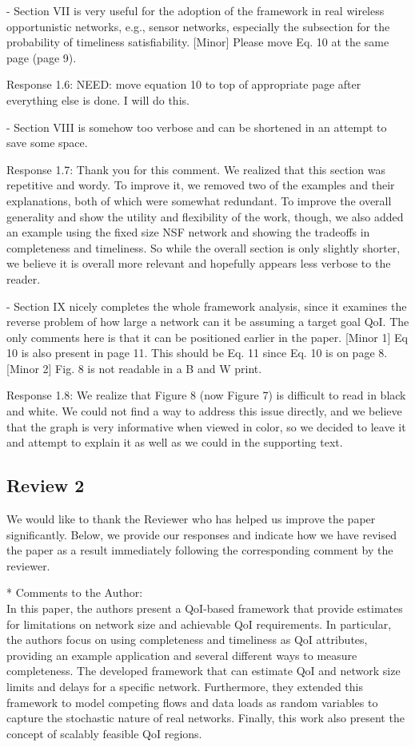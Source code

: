 \documentclass[12pt, letterpaper, onecolumn]{IEEEtran}
\begin{document}
- Section VII is very useful for the adoption of the framework in real wireless opportunistic networks, e.g., sensor networks, especially the subsection for the probability of timeliness satisfiability. [Minor] Please move Eq. 10 at the same page (page 9).

{\color {blue}
Response 1.6: NEED: move equation 10 to top of appropriate page after everything else is done. I will do this.
}

- Section VIII is somehow too verbose and can be shortened in an attempt to save some space.

{\color {blue}
Response 1.7: Thank you for this comment. We realized that this section was repetitive and wordy. To improve it, we removed two of the examples and their explanations, both of which were somewhat redundant. To improve the overall generality and show the utility and flexibility of the work, though, we also added an example using the fixed size NSF network and showing the tradeoffs in completeness and timeliness. So while the overall section is only slightly shorter, we believe it is overall more relevant and hopefully appears less verbose to the reader.
}

- Section IX nicely completes the whole framework analysis, since it examines the reverse problem of how large a network can it be assuming a target goal QoI. The only comments here is that it can be positioned earlier in the paper. [Minor 1] Eq 10 is also present in page 11. This should be Eq. 11 since Eq. 10 is on page 8. [Minor 2] Fig. 8 is not readable in a B and W print. 

{\color {blue}
Response 1.8: We realize that Figure 8 (now Figure 7) is difficult to read in black and white. We could not find a way to address this issue directly, and we believe that the graph is very informative when viewed in color, so we decided to leave it and attempt to explain it as well as we could in the supporting text.
}


\newpage
\subsection{Review 2 }
{ \color {blue}We would like to thank the Reviewer who has helped us improve the paper significantly. Below, we provide our responses and indicate how we have revised the paper as a result immediately following the corresponding comment by the reviewer.}

\noindent** Comments to the Author: \\
In this paper, the authors present a QoI-based framework that provide estimates for limitations on network size and achievable QoI requirements. In particular, the authors focus on using completeness and timeliness as QoI attributes, providing an example application and several different ways to measure completeness. The developed framework that can estimate QoI and network size limits and delays for a specific network. Furthermore, they extended this framework to model competing flows and data loads as random variables to capture the stochastic nature of real networks. Finally, this work also present the concept of scalably feasible QoI regions.
\end{document}
